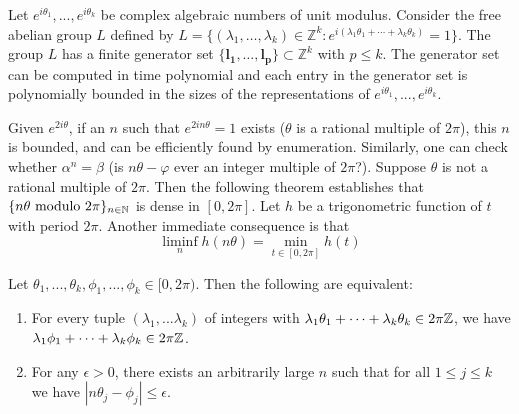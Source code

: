 \begin{theorem}
  \label{thm:abelian}
  Let $e^{i \theta_1},...,e^{i \theta_k}$ be complex algebraic numbers of unit modulus. Consider the free abelian group $L$ defined by $L = \{(\lambda_1, \ldots ,\lambda_k) \in \mathbb{Z}^k: 
  e^{i (\lambda_1 \theta_1 + \cdots +  \lambda_k \theta_k)} = 1 \}$. 
  The group $L$ has a finite generator set $\{ \mathbf{l_1}, \ldots, \mathbf{l_p}\} \subset \mathbb{Z}^k$ with $p \le k$. The generator set can be computed in time polynomial and
  each entry in the generator set is polynomially bounded in the sizes of the representations of $e^{i \theta_1},...,e^{i \theta_k}$.
  \end{theorem}
 Given $e^{2i\theta}$, if an $n$ such that $e^{2i n \theta} = 1$ exists ($\theta$ is a rational multiple of $2\pi$), this $n$ is bounded, and can be efficiently found by enumeration. Similarly, one can check whether $\alpha^n = \beta$ (is $n\theta - \varphi$ ever an integer multiple of $2\pi$?). Suppose $\theta$ is not a rational multiple of $2\pi$. Then the following theorem establishes that $\{n\theta \text{ modulo } 2\pi\}_{n\in\mathbb{N}}$ is dense in $[0, 2\pi]$. Let $h$ be a trigonometric function of $t$ with period $2\pi$. Another immediate consequence is that
\begin{equation}
\label{eq:liminfmin}
\liminf_n h(n\theta)= \min_{t \in [0, 2\pi]} h(t)
\end{equation}
 
\begin{theorem}
  \label{thm:kronecker}
  Let $\theta_1, ... , \theta_k, \phi_1, ... , \phi_k \in [0, 2\pi)$. Then the following are equivalent:
  \begin{enumerate}
\item For every tuple $(\lambda_1,...\lambda_k)$ of integers with 
    $\lambda_1 \theta_1 + \cdots +  \lambda_k \theta_k \in 2\pi\mathbb{Z}$, 
  we have \\$\lambda_1 \phi_1 + \cdots + \lambda_k \phi_k \in 2\pi\mathbb{Z}$.
  \item For any $\epsilon > 0$, there exists an arbitrarily large $n$ such that for all 
    $1 \le j \le k$ we have $| n \theta_j - \phi_j| \le \epsilon$.
    \end{enumerate}
  \end{theorem}
 
